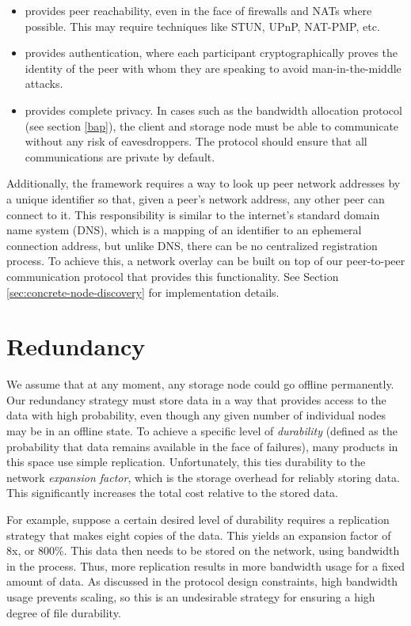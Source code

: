\documentclass[11pt,fleqn,openany]{book}
\begin{document}
\begin{itemize}
\item provides peer reachability, even in the face of firewalls
and NATs where possible.
This may require techniques like STUN, UPnP, NAT-PMP, etc.
\item provides authentication, where each participant cryptographically
proves the identity of the peer with whom they are speaking to avoid
man-in-the-middle attacks.
\item provides complete privacy. In cases such as the bandwidth allocation
protocol (see section \ref{bap}), the client and storage node must be able
to communicate without any risk of eavesdroppers. The protocol should
ensure that all communications are private by default.
\end{itemize}

Additionally, the framework requires a way to look up peer network addresses
by a unique identifier so that, given a peer's network address, any other
peer can connect to it. This responsibility is similar to the internet's
standard domain name system (DNS), which is a mapping of an identifier to an
ephemeral connection address, but unlike DNS, there can be no centralized
registration process.
To achieve this, a network overlay can be
built on top of our peer-to-peer communication protocol that provides this
functionality. See Section \ref{sec:concrete-node-discovery} for
implementation details.

\section{Redundancy}\label{sec:framework-redundancy}

We assume that at any moment, any storage node could go offline permanently.
Our redundancy
strategy must store data in a way that provides access to the data with high
probability, even though any given number of individual nodes may be in
an offline state. To
achieve a specific level of {\em durability} (defined as the probability that
data remains available in the face of failures), many products in this space use
simple replication. Unfortunately, this ties durability to the network {\em
expansion factor}, which is the storage overhead for reliably storing data. This
significantly increases the total cost relative to the stored data.

For example, suppose a certain desired level of durability requires a
replication strategy that makes eight copies of the data. This yields an
expansion factor of 8x, or 800\%. This data then needs to be stored on the
network, using bandwidth in the process. Thus, more replication results in more
bandwidth usage for a fixed amount of data. As discussed in the protocol design
constraints, high bandwidth usage prevents scaling, so this is an undesirable
strategy for ensuring a high degree of file durability.
\end{document}
